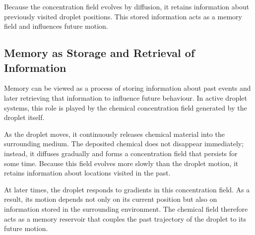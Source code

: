 Because the concentration field evolves by diffusion\cite{droplet2025}, it retains
information about previously visited droplet positions. This stored
information acts as a memory field and influences future motion.

\subsection{Memory as Storage and Retrieval of Information}

Memory can be viewed as a process of storing information about past events
and later retrieving that information to influence future behaviour\cite{droplet2025}. In
active droplet systems, this role is played by the chemical concentration
field generated by the droplet itself.

As the droplet moves, it continuously releases chemical material into the
surrounding medium. The deposited chemical does not disappear immediately;
instead, it diffuses gradually and forms a concentration field that
persists for some time. Because this field evolves more slowly than the
droplet motion, it retains information about locations visited in the
past.

At later times, the droplet responds to gradients in this concentration
field. As a result, its motion depends not only on its current position
but also on information stored in the surrounding environment. The
chemical field therefore acts as a memory reservoir that couples the past
trajectory of the droplet to its future motion.

